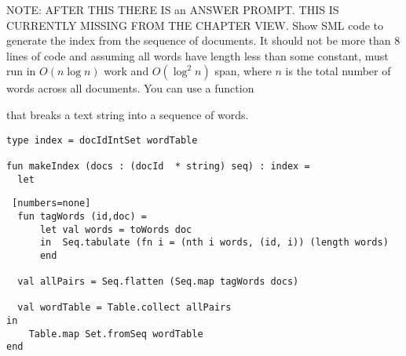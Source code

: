  

\begin{problem}[8pts]

NOTE: AFTER THIS THERE IS an ANSWER PROMPT.  THIS IS CURRENTLY MISSING FROM THE CHAPTER VIEW.
\answer
Show SML code to generate the index from the sequence of documents.
It should not be more than 8 lines of code and assuming all words have
length less than some constant, must run in $O(n \log n)$ work and
$O(\log^2 n)$ span, where $n$ is the total number of words across all
documents.    You can use a function
\begin{quote}
\end{quote}
that breaks a text string into a sequence of words.

\begin{lstlisting}[numbers=none]
type index = docIdIntSet wordTable

fun makeIndex (docs : (docId  * string) seq) : index =
  let
\end{lstlisting}

\sol
\begin{lstlisting} [numbers=none]
  fun tagWords (id,doc) = 
      let val words = toWords doc
      in  Seq.tabulate (fn i = (nth i words, (id, i)) (length words) 
      end

  val allPairs = Seq.flatten (Seq.map tagWords docs)

  val wordTable = Table.collect allPairs
in
    Table.map Set.fromSeq wordTable
end
\end{lstlisting}
\end{problem}


